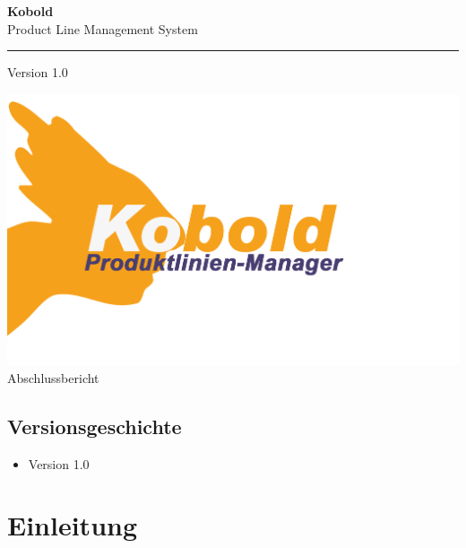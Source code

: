 \documentclass[a4paper,titlepage,12pt,ngerman]{scrbook}
\newcommand\version{Version 1.0 \xspace}
\begin{document}

\begin{titlepage}
\renewcommand{\thefootnote}{\fnsymbol{footnote}}
{\Huge
\raggedright
\textbf{\bf Kobold} \\
\huge Product Line Management System
\rule{\textwidth}{0.75pt}
\par
}
\begin{flushleft}
\normalsize
\version
\end{flushleft}


\vfill
\includegraphics[width=15cm]{../common/logo-color.png}
\vfill
{\parindent=0cm
\Huge Abschlussbericht
}


\setcounter{footnote}{0}
\end{titlepage}


\section*{Versionsgeschichte}

\begin{itemize}

\item Version 1.0 

\end{itemize}


\tableofcontents

\chapter{Einleitung}
\end{document}
